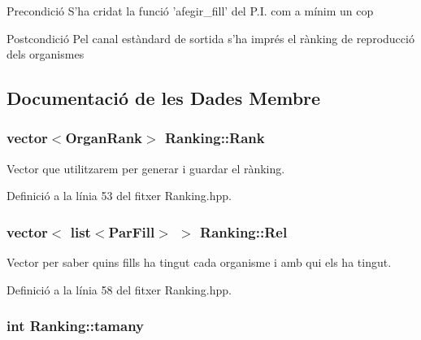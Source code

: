 \begin{DoxyPrecond}{Precondició}
S'ha cridat la funció 'afegir\-\_\-fill' del P.\-I. com a mínim un cop 
\end{DoxyPrecond}
\begin{DoxyPostcond}{Postcondició}
Pel canal estàndard de sortida s'ha imprés el rànking de reproducció dels organismes 
\end{DoxyPostcond}


\subsection{Documentació de les Dades Membre}
\hypertarget{class_ranking_a23ba29c13cb5ac32d3fc97252f20afde}{
\subsubsection[{Rank}]{\setlength{\rightskip}{0pt plus 5cm}vector$<${\bf Organ\-Rank}$>$ Ranking\-::\-Rank\hspace{0.3cm}{\ttfamily [private]}}}\label{class_ranking_a23ba29c13cb5ac32d3fc97252f20afde}


Vector que utilitzarem per generar i guardar el rànking. 



Definició a la línia 53 del fitxer Ranking.\-hpp.

\hypertarget{class_ranking_a714b5b8881dccd99dad7e58b81ce7769}{
\subsubsection[{Rel}]{\setlength{\rightskip}{0pt plus 5cm}vector$<$ list$<${\bf Par\-Fill}$>$ $>$ Ranking\-::\-Rel\hspace{0.3cm}{\ttfamily [private]}}}\label{class_ranking_a714b5b8881dccd99dad7e58b81ce7769}


Vector per saber quins fills ha tingut cada organisme i amb qui els ha tingut. 



Definició a la línia 58 del fitxer Ranking.\-hpp.

\hypertarget{class_ranking_a3001b3854a474fc12c0fc31e0baea946}{
\subsubsection[{tamany}]{\setlength{\rightskip}{0pt plus 5cm}int Ranking\-::tamany\hspace{0.3cm}{\ttfamily [private]}}}\label{class_ranking_a3001b3854a474fc12c0fc31e0baea946}


